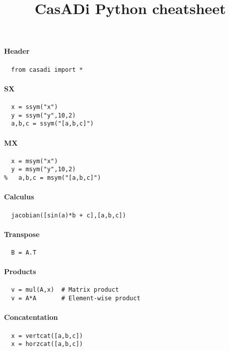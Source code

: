 \documentclass[a4paper,8pt,twocolumn]{article}
\begin{document}
\title{CasADi Python cheatsheet}
\date{}
\maketitle

\paragraph{Header}
\begin{verbatim}
  from casadi import *
\end{verbatim}

\paragraph{SX}
\begin{verbatim}
  x = ssym("x")
  y = ssym("y",10,2)
  a,b,c = ssym("[a,b,c]")
\end{verbatim}

\paragraph{MX}
\begin{verbatim}
  x = msym("x")
  y = msym("y",10,2)
%   a,b,c = msym("[a,b,c]")
\end{verbatim}

\paragraph{Calculus}
\begin{verbatim}
  jacobian([sin(a)*b + c],[a,b,c])
\end{verbatim}

\paragraph{Transpose}
\begin{verbatim}
  B = A.T
\end{verbatim}

\paragraph{Products}
\begin{verbatim}
  v = mul(A,x)  # Matrix product
  v = A*A       # Element-wise product
\end{verbatim}

\paragraph{Concatentation}
\begin{verbatim}
  x = vertcat([a,b,c])
  x = horzcat([a,b,c])
\end{verbatim}
\end{document}
